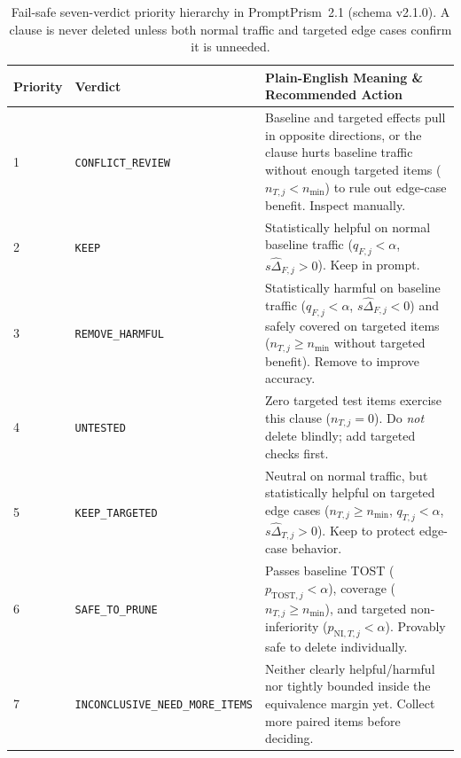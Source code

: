 \documentclass[11pt,a4paper]{article}
\newcommand{\method}{PromptPrism}
\begin{document}
\begin{table}[!ht]
\centering
\footnotesize
\setlength{\tabcolsep}{4.0pt}
\caption{Fail-safe seven-verdict priority hierarchy in \method{}~2.1 (schema v2.1.0). A clause is never deleted unless both normal traffic and targeted edge cases confirm it is unneeded.}
\label{tab:p2_verdicts}
\begin{tabularx}{\textwidth}{@{}ll>{\raggedright\arraybackslash}X@{}}
\toprule
\textbf{Priority} & \textbf{Verdict} & \textbf{Plain-English Meaning \& Recommended Action} \\
\midrule
1 & \texttt{CONFLICT\_REVIEW} & Baseline and targeted effects pull in opposite directions, or the clause hurts baseline traffic without enough targeted items ($n_{T,j} < n_{\min}$) to rule out edge-case benefit. Inspect manually. \\
2 & \texttt{KEEP} & Statistically helpful on normal baseline traffic ($q_{F,j} < \alpha$, $s\hat{\Delta}_{F,j} > 0$). Keep in prompt. \\
3 & \texttt{REMOVE\_HARMFUL} & Statistically harmful on baseline traffic ($q_{F,j} < \alpha$, $s\hat{\Delta}_{F,j} < 0$) and safely covered on targeted items ($n_{T,j} \ge n_{\min}$ without targeted benefit). Remove to improve accuracy. \\
4 & \texttt{UNTESTED} & Zero targeted test items exercise this clause ($n_{T,j} = 0$). Do \emph{not} delete blindly; add targeted checks first. \\
5 & \texttt{KEEP\_TARGETED} & Neutral on normal traffic, but statistically helpful on targeted edge cases ($n_{T,j} \ge n_{\min}$, $q_{T,j} < \alpha$, $s\hat{\Delta}_{T,j} > 0$). Keep to protect edge-case behavior. \\
6 & \texttt{SAFE\_TO\_PRUNE} & Passes baseline TOST ($p_{\mathrm{TOST},j} < \alpha$), coverage ($n_{T,j} \ge n_{\min}$), and targeted non-inferiority ($p_{\mathrm{NI},T,j} < \alpha$). Provably safe to delete individually. \\
7 & \texttt{INCONCLUSIVE\_NEED\_MORE\_ITEMS} & Neither clearly helpful/harmful nor tightly bounded inside the equivalence margin yet. Collect more paired items before deciding. \\
\bottomrule
\end{tabularx}
\end{table}
\end{document}
